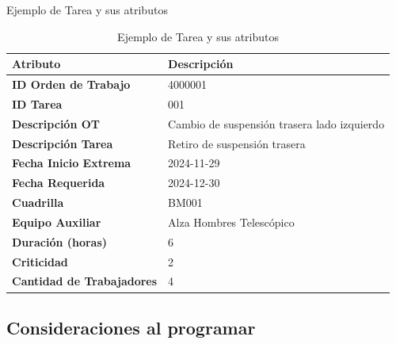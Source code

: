 \documentclass[pdfpagelabels=false, usepdftitle=false, aspectratio=169]{beamer}
\begin{document}
\begin{frame}[fragile]{Ejemplo de Tarea y sus atributos}
\vspace{-2ex}
\scriptsize
\begin{table}[htbp]
    \centering
    \captionsetup{justification=centering}
    \vspace{0.3cm}
    \begin{tabular}{p{4cm} p{5.5cm}}
        \toprule
        \textbf{Atributo} & \textbf{Descripción} \\
        \midrule
        \textbf{ID Orden de Trabajo} & 4000001 \\
        \textbf{ID Tarea} & 001 \\
        \textbf{Descripción OT} & Cambio de suspensión trasera lado izquierdo \\
        \textbf{Descripción Tarea} & Retiro de suspensión trasera \\
        \textbf{Fecha Inicio Extrema} & 2024-11-29 \\
        \textbf{Fecha Requerida} & 2024-12-30 \\
        \textbf{Cuadrilla} & BM001 \\
        \textbf{Equipo Auxiliar} & Alza Hombres Telescópico \\
        \textbf{Duración (horas)} & 6 \\
        \textbf{Criticidad} & 2 \\
        \textbf{Cantidad de Trabajadores} & 4 \\
        \bottomrule
    \end{tabular}
    \caption{Ejemplo de Tarea y sus atributos }%
    \label{table:task}
\end{table}
\vfill
\end{frame}


\subsection{Consideraciones al programar}
\end{document}
